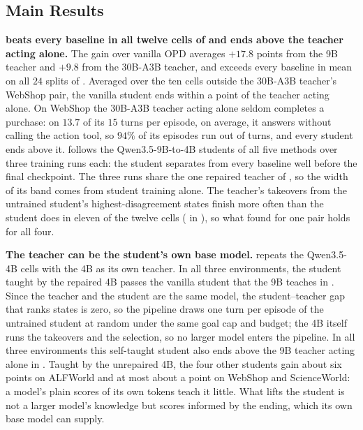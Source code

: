 \subsection{Main Results}
\label{sec:exp-main}



\textbf{\method{} beats every baseline in all twelve cells of  and ends above the teacher acting alone.} The gain over vanilla OPD averages $+17.8$ points from the 9B teacher and $+9.8$ from the 30B-A3B teacher, and \method{} exceeds every baseline in mean on all $24$ splits of .
Averaged over the ten cells outside the 30B-A3B teacher's WebShop pair, the vanilla student ends within a point of the teacher acting alone. On WebShop the 30B-A3B teacher acting alone seldom completes a purchase: on $13.7$ of its $15$ turns per episode, on average, it answers without calling the action tool, so $94\%$ of its episodes run out of turns, and every student ends above it.  follows the Qwen3.5-9B-to-4B students of all five methods over three training runs each: the \method{} student separates from every baseline well before the final checkpoint. The three \method{} runs share the one repaired teacher of , so the width of its band comes from student training alone. The teacher's takeovers from the untrained student's highest-disagreement states finish more often than the student does in eleven of the twelve cells ( in ), so what  found for one pair holds for all four.



\textbf{The teacher can be the student's own base model.}
 repeats the Qwen3.5-4B cells with the 4B as its own teacher. In all three environments, the \method{} student taught by the repaired 4B passes the vanilla student that the 9B teaches in . Since the teacher and the student are the same model, the student--teacher gap that ranks states is zero, so the pipeline draws one turn per episode of the untrained student at random under the same goal cap and budget; the 4B itself runs the takeovers and the selection, so no larger model enters the pipeline. In all three environments this self-taught student also ends above the 9B teacher acting alone in . Taught by the unrepaired 4B, the four other students gain about six points on ALFWorld and at most about a point on WebShop and ScienceWorld: a model's plain scores of its own tokens teach it little. What lifts the student is not a larger model's knowledge but scores informed by the ending, which its own base model can supply.

